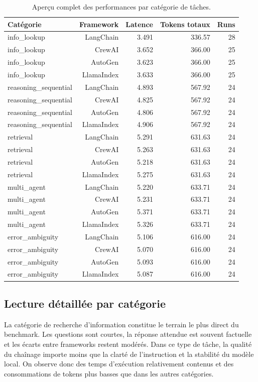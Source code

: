 \documentclass[11pt,a4paper]{article}
\begin{document}
\begin{table}[H]
\centering
\small
\begin{tabularx}{\textwidth}{@{}lrrrr@{}}
\toprule
Catégorie & Framework & Latence & Tokens totaux & Runs \\
\midrule
info\_lookup & LangChain & 3.491 & 336.57 & 28 \\
info\_lookup & CrewAI & 3.652 & 366.00 & 25 \\
info\_lookup & AutoGen & 3.623 & 366.00 & 25 \\
info\_lookup & LlamaIndex & 3.633 & 366.00 & 25 \\
reasoning\_sequential & LangChain & 4.893 & 567.92 & 24 \\
reasoning\_sequential & CrewAI & 4.825 & 567.92 & 24 \\
reasoning\_sequential & AutoGen & 4.806 & 567.92 & 24 \\
reasoning\_sequential & LlamaIndex & 4.906 & 567.92 & 24 \\
retrieval & LangChain & 5.291 & 631.63 & 24 \\
retrieval & CrewAI & 5.263 & 631.63 & 24 \\
retrieval & AutoGen & 5.218 & 631.63 & 24 \\
retrieval & LlamaIndex & 5.275 & 631.63 & 24 \\
multi\_agent & LangChain & 5.220 & 633.71 & 24 \\
multi\_agent & CrewAI & 5.231 & 633.71 & 24 \\
multi\_agent & AutoGen & 5.371 & 633.71 & 24 \\
multi\_agent & LlamaIndex & 5.326 & 633.71 & 24 \\
error\_ambiguity & LangChain & 5.106 & 616.00 & 24 \\
error\_ambiguity & CrewAI & 5.070 & 616.00 & 24 \\
error\_ambiguity & AutoGen & 5.093 & 616.00 & 24 \\
error\_ambiguity & LlamaIndex & 5.087 & 616.00 & 24 \\
\bottomrule
\end{tabularx}
\caption{Aperçu complet des performances par catégorie de tâches.}
\label{tab:categoryresults}
\end{table}

\subsection{Lecture détaillée par catégorie}
La catégorie de recherche d'information constitue le terrain le plus direct du benchmark. Les questions sont courtes, la réponse attendue est souvent factuelle et les écarts entre frameworks restent modérés. Dans ce type de tâche, la qualité du chaînage importe moins que la clarté de l'instruction et la stabilité du modèle local. On observe donc des temps d'exécution relativement contenus et des consommations de tokens plus basses que dans les autres catégories.
\end{document}
